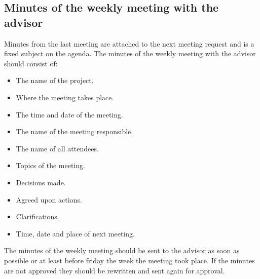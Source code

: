 \subsection{Minutes of the weekly meeting with the advisor}
Minutes from the last meeting are attached to the next meeting request and is a fixed subject on the agenda.
\newline
\newline
The minutes of the weekly meeting with the advisor should consist of:
\begin{itemize}
\item{}The name of the project.
\item{}Where the meeting takes place.
\item{}The time and date of the meeting.
\item{}The name of the meeting responsible.
\item{}The name of all attendees.
\item{}Topics of the meeting.
\item{}Decisions made.
\item{}Agreed upon actions.
\item{}Clarifications.
\item{}Time, date and place of next meeting.
\end{itemize}

The minutes of the weekly meeting should be sent to the advisor as soon as possible or at least before friday the week the meeting took place. If the minutes are not approved they should be rewritten and sent again for approval. 


